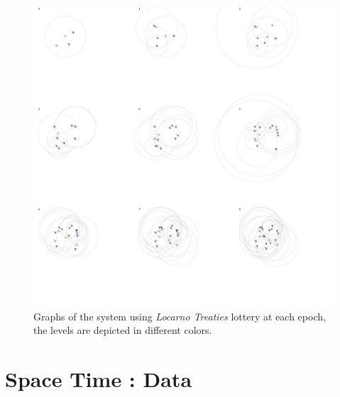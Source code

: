 \documentclass[a4paper,11pt,twoside,openright]{report}
\begin{document}
\begin{figure}[!h] 
\centering
\includegraphics[width=500pt]{figures/LocarnoTreaties-LocarnoFinal}
\caption{Graphs of the system using \textit{Locarno Treaties} lottery at each
  epoch, the levels are depicted in different colors.}
  \label{fig:LocarnoTreaties-LocarnoFinal}
\end{figure}

\chapter{Space Time : Data} \label{app:SpaceTime-data}
\end{document}
